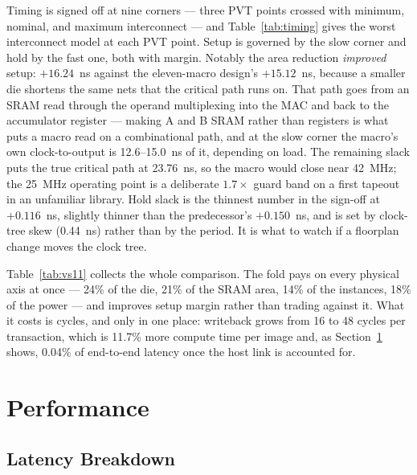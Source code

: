 \documentclass[conference,a4paper]{APSIPA2026}
\begin{document}
Timing is signed off at nine corners --- three PVT points crossed with minimum, nominal, and maximum interconnect --- and Table~\ref{tab:timing} gives the worst interconnect model at each PVT point. Setup is governed by the slow corner and hold by the fast one, both with margin. Notably the area reduction \emph{improved} setup: $+16.24$~ns against the eleven-macro design's $+15.12$~ns, because a smaller die shortens the same nets that the critical path runs on. That path goes from an SRAM read through the operand multiplexing into the MAC and back to the accumulator register --- making A and B SRAM rather than registers is what puts a macro read on a combinational path, and at the slow corner the macro's own clock-to-output is 12.6--15.0~ns of it, depending on load. The remaining slack puts the true critical path at 23.76~ns, so the macro would close near 42~MHz; the 25~MHz operating point is a deliberate $1.7\times$ guard band on a first tapeout in an unfamiliar library. Hold slack is the thinnest number in the sign-off at $+0.116$~ns, slightly thinner than the predecessor's $+0.150$~ns, and is set by clock-tree skew (0.44~ns) rather than by the period. It is what to watch if a floorplan change moves the clock tree.


Table~\ref{tab:vs11} collects the whole comparison. The fold pays on every physical axis at once --- 24\% of the die, 21\% of the SRAM area, 14\% of the instances, 18\% of the power --- and improves setup margin rather than trading against it. What it costs is cycles, and only in one place: writeback grows from 16 to 48 cycles per transaction, which is 11.7\% more compute time per image and, as Section~\ref{sec:perf} shows, 0.04\% of end-to-end latency once the host link is accounted for.

\clearpage
\section{Performance}\label{sec:perf}

\subsection{Latency Breakdown}
\end{document}
